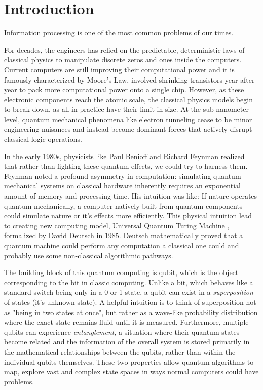 \section{Introduction}

Information processing is one of the most common problems of our times. 
%
%

For decades, the engineers has relied on the predictable, deterministic laws of classical physics to manipulate discrete zeros and ones inside the computers. 
Current computers are still improving their computational power and it is famously characterized by Moore's Law, 
involved shrinking transistors year after year to pack more computational power onto a single chip. 
However, as these electronic components reach the atomic scale, the classical physics models begin to break down, as all in practice have their limit in size. 
At the sub-nanometer level, quantum mechanical phenomena like electron tunneling cease to be minor engineering nuisances and instead become dominant forces that actively 
disrupt classical logic operations.
%
%

In the early 1980s, physicists like Paul Benioff \cite{benioff1980} and Richard Feynman \cite{feynman1982} realized that rather than fighting these quantum effects, we could try to harness them.
Feynman noted a profound asymmetry in computation: simulating quantum mechanical systems on classical hardware inherently requires an exponential amount of memory and processing time. 
His intuition was like: If nature operates quantum mechanically, a computer natively built from quantum components could simulate nature or it's effects more efficiently. 
This physical intuition lead to creating new computing model, Universal Quantum Turing Machine \cite{deutsch1985}, formalized by David Deutsch in 1985.
Deutsch mathematically proved that a quantum machine could perform any computation a classical one could and probably use some non-classical algorithmic pathways.
%
%

The building block of this quantum computing is qubit, which is the object corresponding to the bit in classic computing.
Unlike a bit, which behaves like a standard switch being only in a 0 or 1 state, a qubit can exist in a \textit{superposition} of states (it's unknown state).
A helpful intuition is to think of superposition not as "being in two states at once", but rather as a wave-like probability distribution where the exact state remains fluid until it is measured. 
Furthermore, multiple qubits can experience \textit{entanglement}, a situation where their quantum states become related and the information of the overall system is stored primarily in 
the mathematical relationships between the qubits, rather than within the individual qubits themselves. 
These two properties allow quantum algorithms to map, explore vast and complex state spaces in ways normal computers could have problems.
%
%


